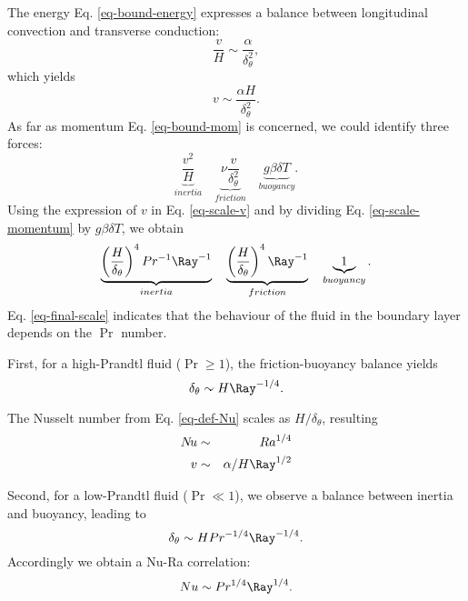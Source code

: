 The energy Eq. \ref{eq-bound-energy} expresses a balance between longitudinal convection and transverse conduction:
\begin{equation}
	\frac{v}{H} \sim \frac{\alpha}{\delta_\theta^2},
\end{equation}
which yields
\begin{equation} \label{eq-scale-v}
	v \sim \frac{\alpha H}{\delta_\theta^2}.
\end{equation}
As far as momentum Eq. \ref{eq-bound-mom} is concerned, we could identify three forces:
\begin{equation} \label{eq-scale-momentum}
	\underbrace{\frac{v^2}{H}}_{inertia} \quad \underbrace{\nu \frac{v}{\delta_\theta^2}}_{friction} \quad \underbrace{g \beta \delta T}_{buoyancy}.
\end{equation}
Using the expression of $v$ in Eq. \ref{eq-scale-v} and by dividing Eq. \ref{eq-scale-momentum} by $g \beta \delta T$, we obtain
\begin{equation} \label{eq-final-scale}
	\underbrace{\left( \frac{H}{\delta_\theta} \right)^4 Pr ^{-1} \Ray^{-1}}_{inertia} \quad  \underbrace{\left( \frac{H}{\delta_\theta} \right)^4 \Ray^{-1}}_{friction} \quad \underbrace{1}_{buoyancy}.
\end{equation}
Eq. \ref{eq-final-scale} indicates that the behaviour of the fluid in the boundary layer depends on the $\Pr$ number.

\noindent First, for a high-Prandtl fluid ($\Pr \geq 1$), the friction-buoyancy balance yields
\begin{equation} \label{eq-scale-nbd-high-Pr}
	\delta_\theta \sim H \Ray^{-1/4}.
\end{equation}

\noindent The Nusselt number from Eq. \ref{eq-def-Nu} scales as $H/\delta_\theta$, resulting
\begin{eqnarray}
	N\!u & \sim & Ra^{1/4} \\
	v & \sim & \alpha/H \Ray^{1/2}
\end{eqnarray}

\noindent Second, for a low-Prandtl fluid ($\Pr \ll 1$), we observe a balance between inertia and buoyancy, leading to
\begin{equation} \label{eq-corr-Low-Pr}
	\delta_\theta \sim H Pr^{-1/4} \Ray^{-1/4}.
\end{equation}
Accordingly we obtain a Nu-Ra correlation:
\begin{equation}
	Nu \sim Pr^{1/4} \Ray^{1/4}.
\end{equation}

%
%
%
%
%
%

